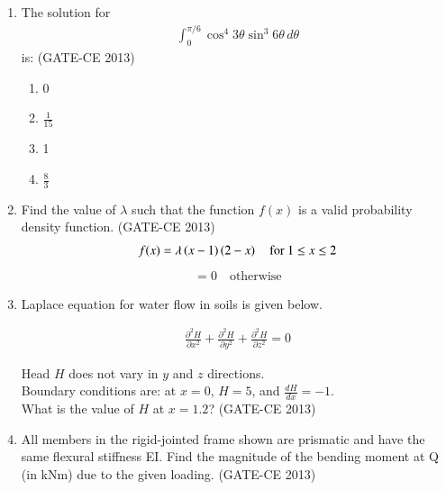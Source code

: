 \documentclass[journal,12pt,onecolumn]{article}
\theoremstyle{remark}
\begin{document}
\begin{enumerate}
    \item The solution for 
    \begin{align}
    \int_0^{\pi/6} \cos^4 3\theta \sin^3 6\theta \, d\theta 
    \end{align}
    is: (GATE-CE 2013)
    \begin{multicols}{4}
    \begin{enumerate}
        \item 0 
        \item $\frac{1}{15}$ 
        \item 1 
        \item $\frac{8}{3}$
    \end{enumerate}
    \end{multicols}
    
    \item Find the value of $\lambda$ such that the function $f(x)$ is a valid probability density function. \underline{\hspace{3cm}} (GATE-CE 2013)
    \begin{align}
    f(x) = \lambda \left(x-1\right)\left(2-x\right) \quad \text{for } 1 \leq x \leq 2
    \end{align}
    \begin{align}
    = 0 \quad \text{otherwise}
    \end{align}
    
    \item Laplace equation for water flow in soils is given below.
    
    \begin{align}
    \frac{\partial^2 H}{\partial x^2} + \frac{\partial^2 H}{\partial y^2} + \frac{\partial^2 H}{\partial z^2} = 0
    \end{align}
    
    Head $H$ does not vary in $y$ and $z$ directions.\\
    Boundary conditions are: at $x = 0$, $H = 5$, and $\frac{dH}{dx} = -1$.\\
    What is the value of $H$ at $x = 1.2$? \underline{\hspace{3cm}} (GATE-CE 2013)
    
    \item All members in the rigid-jointed frame shown are prismatic and have the same flexural stiffness EI. Find the magnitude of the bending moment at Q (in kNm) due to the given loading. \underline{\hspace{3cm}} (GATE-CE 2013)
    

\end{enumerate}
\end{document}
